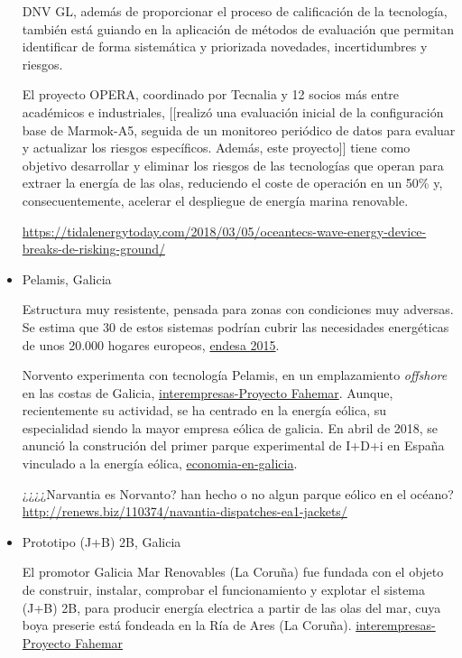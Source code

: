 \begin{itemize}
  DNV GL, además de proporcionar el proceso de calificación de la
  tecnología, también está guiando en la aplicación de métodos de
  evaluación que permitan identificar de forma sistemática y priorizada
  novedades, incertidumbres y riesgos.

  El proyecto OPERA, coordinado por Tecnalia y 12 socios más entre
  académicos e industriales, {[}{[}realizó una evaluación inicial de la
  configuración base de Marmok-A5, seguida de un monitoreo periódico de
  datos para evaluar y actualizar los riesgos específicos. Además, este
  proyecto{]}{]} tiene como objetivo desarrollar y eliminar los riesgos
  de las tecnologías que operan para extraer la energía de las olas,
  reduciendo el coste de operación en un 50\% y, consecuentemente,
  acelerar el despliegue de energía marina renovable.

  \url{https://tidalenergytoday.com/2018/03/05/oceantecs-wave-energy-device-breaks-de-risking-ground/}
\item
  Pelamis, Galicia

  Estructura muy resistente, pensada para zonas con condiciones muy
  adversas. Se estima que 30 de estos sistemas podrían cubrir las
  necesidades energéticas de unos 20.000 hogares europeos,
  \href{https://www.solucionesintegralesendesa.com/blog/equipamiento-hogar/ahorro-hogar/energia-undimotriz-el-poder-de-las-olas/}{endesa
  2015}.

  Norvento experimenta con tecnología Pelamis, en un emplazamiento
  \emph{offshore} en las costas de Galicia,
  \href{http://www.interempresas.net/Energia/Articulos/126331-Generar-energia-a-partir-de-energia-undimotriz.html}{interempresas-Proyecto
  Fahemar}. Aunque, recientemente su actividad, se ha centrado en la
  energía eólica, su especialidad siendo la mayor empresa eólica de
  galicia. En abril de 2018, se anunció la construción del primer parque
  experimental de I+D+i en España vinculado a la energía eólica,
  \href{http://www.economiaengalicia.com/articulo/empresa/norvento-construira-primer-parque-experimental-idi-espana-vinculado-energia-eolica/20170404180131003321.html}{economia-en-galicia}.

  ¿¿¿¿Narvantia es Norvanto? han hecho o no algun parque eólico en el
  océano?
  \url{http://renews.biz/110374/navantia-dispatches-ea1-jackets/}
\item
  Prototipo (J+B) 2B, Galicia

  El promotor Galicia Mar Renovables (La Coruña) fue fundada con el
  objeto de construir, instalar, comprobar el funcionamiento y explotar
  el sistema (J+B) 2B, para producir energía electrica a partir de las
  olas del mar, cuya boya preserie está fondeada en la Ría de Ares (La
  Coruña).
  \href{http://www.interempresas.net/Energia/Articulos/126331-Generar-energia-a-partir-de-energia-undimotriz.html}{interempresas-Proyecto
  Fahemar}


\end{itemize}
